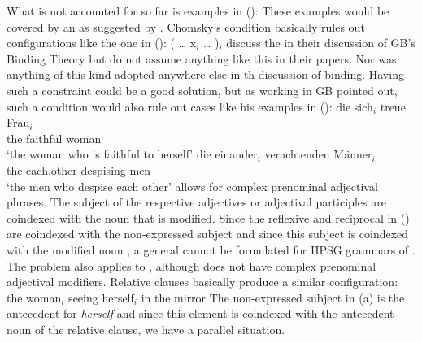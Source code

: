 \documentclass[output=paper
 	        ,biblatex
                ,babelshorthands
                ,newtxmath
                ,draftmode
                ,colorlinks, citecolor=brown
]{langscibook}
\begin{document}
What is not accounted for so far is  examples in ():
\eal
{}
\zl
These examples would be covered by an \iwithinic{} as suggested by
\citet[]{Chomsky81a}. Chomsky's condition basically rules out configurations like the one
in ():
\ea
( \ldots{} x$_i$ \ldots{} )$_i$
\z
\citet[]{ps2} discuss the \iwithinic in their discussion of GB's Binding Theory but do not
assume anything like this in their papers. Nor was anything of this kind adopted anywhere else in
th discussion of binding. Having such a constraint could be a good solution, but as
\citet[]{Fanselow86a} working in GB pointed out, such a condition would also rule out cases like his examples in ():
\eal
\ex
\gll die sich$_i$ treue Frau$_i$\\
     the \self{} faithful woman\\
\glt `the woman who is faithful to herself'
\ex 
\gll die einander$_i$ verachtenden Männer$_i$\\
     the each.other   despising    men\\
\glt `the men who despise each other'
\zl
{} allows for complex prenominal adjectival phrases. The subject of the respective adjectives or
adjectival participles are coindexed with the noun that is modified. Since the reflexive and
reciprocal in () are coindexed with the non-expressed subject and since this subject is
coindexed with the modified noun \citep[Section~3.2.7]{Mueller2002b}, a general \iwithinic cannot be formulated for HPSG
grammars of . The problem also applies to , although  does not have complex
prenominal adjectival modifiers. Relative clauses basically produce a similar configuration:
\eal
\ex the woman$_i$ seeing herself$_i$ in the mirror
\zl
The non-expressed subject in (a) is the antecedent for \emph{herself} and since this element
is coindexed with the antecedent noun of the relative clause, we have a parallel
situation. 
\end{document}
